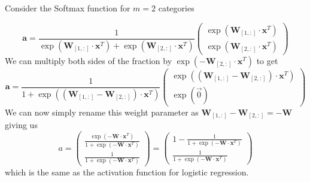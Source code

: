 \documentclass[11pt,a4paper,titlepage]{article}
\begin{document}
Consider the Softmax function for $m=2$ categories

\begin{equation}
\textbf{a} = \frac{1}{ \exp(\textbf{W}_{[1,:]}\cdot \textbf{x}^T)  + \exp( \textbf{W}_{[2,:]} \cdot \textbf{x}^T ) }
\begin{pmatrix}
\exp( \textbf{W}_{[1,:]} \cdot \textbf{x}^T) \\
\exp( \textbf{W}_{[2,:]} \cdot \textbf{x}^T)
\end{pmatrix}
\end{equation}
We can multiply both sides of the fraction by $\exp(- \textbf{W}_{[2,:]} \cdot \textbf{x}^T)$ to get
\begin{equation}
\textbf{a} = \frac{1}{ 1  + \exp( (\textbf{W}_{[1,:]} -\textbf{W}_{[2,:]})\cdot \textbf{x}^T) }
\begin{pmatrix}
\exp( (\textbf{W}_{[1,:]} -\textbf{W}_{[2,:]})\cdot \textbf{x}^T) \\
\exp( \vec{0})
\end{pmatrix}
\end{equation}
We can now simply rename this weight parameter as $\textbf{W}_{[1,:]} -\textbf{W}_{[2,:]} = -\textbf{W}$ giving us
\begin{equation}
a = \begin{pmatrix}
\frac{\exp( -\textbf{W}\cdot \textbf{x}^T)}{1+\exp( -\textbf{W}\cdot \textbf{x}^T)} \\
\frac{1}{1+ \exp( -\textbf{W}\cdot \textbf{x}^T)}
\end{pmatrix} = \begin{pmatrix}
1-\frac{1}{1+\exp( -\textbf{W}\cdot \textbf{x}^T)} \\
\frac{1}{1+ \exp( -\textbf{W}\cdot \textbf{x}^T)}
\end{pmatrix} 
\end{equation}
which is the same as the activation function for logistic regression.
\end{document}
